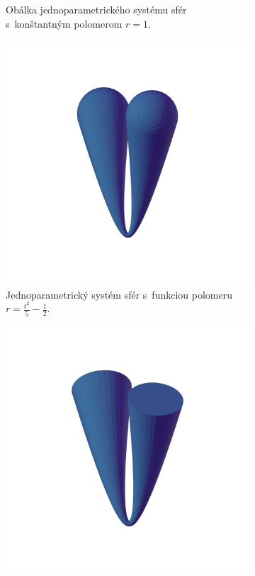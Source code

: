 \begin{figure}[h]
\begin{subfigure}[t]{0.49\textwidth}
		\caption{Obálka jednoparametrického systému sfér s~konštantným polomerom $r=1$.}
        \label{fig:plocha2}
    \end{subfigure}
    \hfill
    \begin{subfigure}[t]{0.49\textwidth}
        \centering
        \includegraphics[width=\textwidth, trim=0mm 50mm 0mm 100mm, clip=true]{images/bienert_function_radius_spheres.png}
        	\caption{Jednoparametrický systém sfér s~funkciou polomeru $r=\frac{t^2}{5}-\frac{1}{2}$.}
        \label{fig:plocha3}
    \end{subfigure}
    \hfill
    \begin{subfigure}[t]{0.49\textwidth}
        \centering
        \includegraphics[width=\textwidth, trim=0mm 50mm 0mm 50mm, clip=true]{images/bienert_function_radius_envelope.png}

\end{subfigure}
\end{figure}
